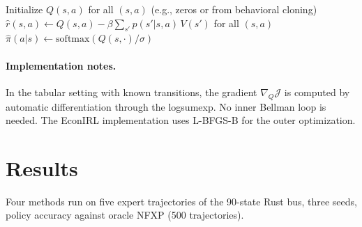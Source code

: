 \documentclass[10pt]{article}
\begin{document}
\begin{algorithm}[H]
\DontPrintSemicolon
\caption{IQ-Learn (tabular DDC setting)}
\label{alg:iqlearn}
\BlankLine
Initialize $Q(s,a)$ for all $(s,a)$ (e.g., zeros or from behavioral cloning)\;
\BlankLine
{}
\BlankLine
{}
$\hat{r}(s,a) \leftarrow Q(s,a) - \beta\sum_{s'} p(s'|s,a)\,V(s')$ for all $(s,a)$\;
$\hat{\pi}(a|s) \leftarrow \text{softmax}(Q(s,\cdot)/\sigma)$\;
\BlankLine
{}
\end{algorithm}

\paragraph{Implementation notes.} In the tabular setting with known transitions, the gradient $\nabla_Q \mathcal{J}$ is computed by automatic differentiation through the logsumexp. No inner Bellman loop is needed. The EconIRL implementation uses L-BFGS-B for the outer optimization.


\section{Results}
\label{sec:results}



Four methods run on five expert trajectories of the 90-state Rust bus, three seeds, policy accuracy against oracle NFXP (500 trajectories).
\end{document}

